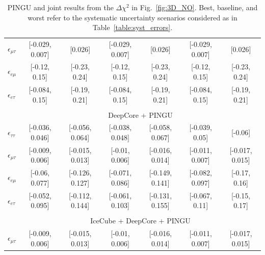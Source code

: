 \documentclass[draft=True]{revtex4-2}
\newcommand{\emt}{\ensuremath{\epsilon_{\mu\tau}}}
\newcommand{\eet}{\epsilon_{e\tau}}
\newcommand{\eem}{\epsilon_{e\mu}}
\newcommand{\ett}{\ensuremath{\epsilon_{\tau\tau}}}
\begin{document}
{{\begin{table}
\begin{tabular}{lcccccc}
      $\emt$ &  [-0.029, 0.007] &          [0.026] &  [-0.029, 0.007] &          [0.026] &  [-0.029, 0.007] &          [0.026] \\
      $\eem$ &  [-0.12, 0.15] &  [-0.23, 0.24] &  [-0.12, 0.15] &  [-0.23, 0.24] &  [-0.12, 0.15] &  [-0.23, 0.24] \\
      $\eet$ &   [-0.084, 0.15] &  [-0.19, 0.21] &   [-0.084, 0.15] &  [-0.19, 0.21] &   [-0.084, 0.15] &  [-0.19, 0.21] \\\\
      & \multicolumn{6}{c}{DeepCore + PINGU} \\
      $\ett$ &  [-0.036, 0.046] &  [-0.056, 0.064] &  [-0.038, 0.048] &  [-0.058, 0.067] &   [-0.039, 0.05] &          [-0.06] \\
      $\emt$ &  [-0.009, 0.006] &  [-0.015, 0.013] &   [-0.01, 0.006] &  [-0.016, 0.014] &  [-0.011, 0.007] &  [-0.017, 0.015] \\
      $\eem$ &   [-0.06, 0.077] &  [-0.126, 0.127] &  [-0.071, 0.086] &  [-0.149, 0.141] &  [-0.082, 0.097] &  [-0.17, 0.16] \\
      $\eet$ &  [-0.052, 0.095] &  [-0.112, 0.144] &  [-0.061, 0.103] &  [-0.131, 0.155] &  [-0.067, 0.11] &  [-0.15, 0.17] \\\\
      & \multicolumn{6}{c}{IceCube + DeepCore + PINGU}  \\
      $\emt$ &  [-0.009, 0.006] &  [-0.015, 0.013] &   [-0.01, 0.006] &  [-0.016, 0.014] &  [-0.011, 0.007] &  [-0.017, 0.015] \\
      \hline
      \hline
   \end{tabular}
   \caption{PINGU and joint results from the $\Delta \chi^2$ in Fig.~\ref{fig:3D_NO}. Best, baseline, and worst refer to 
   the systematic uncertainty scenarios considered as in Table~\ref{table:syst_errors}.}\label{table:PINGU_joint_results}
\end{table}

}}
\end{document}

